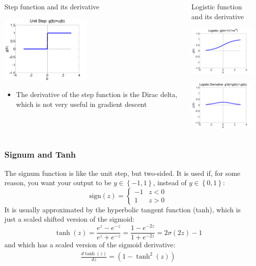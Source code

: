 \documentclass{beamer}
\begin{document}
\begin{frame}
  \begin{columns}[t]
    \column{2.25in}
    \begin{block}{Step function and its derivative}
      \centerline{\includegraphics[width=1.75in]{figs/nn_unitstep.png}}
      \begin{itemize}
      \item The derivative of the step function is the Dirac
        delta, which is not very useful in gradient descent
      \end{itemize}
    \end{block}
    \column{2.25in}
    \begin{block}{Logistic function and its derivative}
      \centerline{\includegraphics[width=1.75in]{figs/nn_logistic.png}}
      \centerline{\includegraphics[width=1.75in]{figs/nn_logisticprime.png}}
    \end{block}
  \end{columns}
\end{frame}

\begin{frame}
  \frametitle{Signum and Tanh}

  The signum function is like the unit step, but two-sided.  It is
  used if, for some reason, you want your output to be
  $y\in\left\{-1,1\right\}$, instead of $y\in\left\{0,1\right\}$:
  \[
  \mbox{sign}(z)=\begin{cases}
  -1 & z<0\\
  1 & z>0
  \end{cases}
  \]
  It is usually approximated by the hyperbolic tangent function
  (tanh), which is just a scaled shifted version of the sigmoid:
  \begin{displaymath}
    \tanh(z) = \frac{e^z-e^{-z}}{e^z+e^{-z}}
    = \frac{1-e^{-2z}}{1+e^{-2z}}
    = 2\sigma(2z)-1
  \end{displaymath}
  and which has a scaled version of the sigmoid derivative:
  \begin{align*}
    \frac{d\tanh(z)}{dz} =\left(1-\tanh^2(z)\right)
  \end{align*}
\end{frame}
\end{document}
